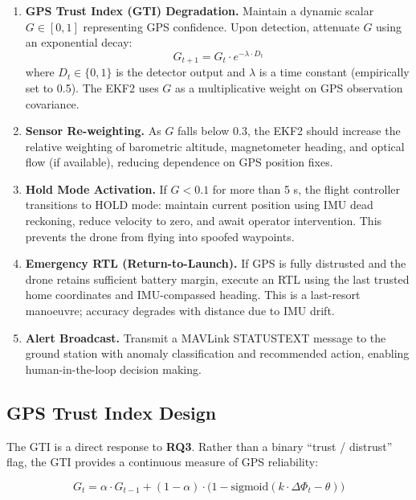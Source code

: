 \documentclass[11pt,a4paper]{article}
\begin{document}
\begin{enumerate}
    \item \textbf{GPS Trust Index (GTI) Degradation.} Maintain a dynamic scalar $G \in [0, 1]$ representing GPS confidence. Upon detection, attenuate $G$ using an exponential decay:
    \begin{equation}
        G_{t+1} = G_t \cdot e^{-\lambda \cdot D_t}
    \end{equation}
    where $D_t \in \{0, 1\}$ is the detector output and $\lambda$ is a time constant (empirically set to 0.5). The EKF2 uses $G$ as a multiplicative weight on GPS observation covariance.

    \item \textbf{Sensor Re-weighting.} As $G$ falls below 0.3, the EKF2 should increase the relative weighting of barometric altitude, magnetometer heading, and optical flow (if available), reducing dependence on GPS position fixes.

    \item \textbf{Hold Mode Activation.} If $G < 0.1$ for more than 5 s, the flight controller transitions to HOLD mode: maintain current position using IMU dead reckoning, reduce velocity to zero, and await operator intervention. This prevents the drone from flying into spoofed waypoints.

    \item \textbf{Emergency RTL (Return-to-Launch).} If GPS is fully distrusted and the drone retains sufficient battery margin, execute an RTL using the last trusted home coordinates and IMU-compassed heading. This is a last-resort manoeuvre; accuracy degrades with distance due to IMU drift.

    \item \textbf{Alert Broadcast.} Transmit a MAVLink STATUSTEXT message to the ground station with anomaly classification and recommended action, enabling human-in-the-loop decision making.
\end{enumerate}

\subsection{GPS Trust Index Design}

The GTI is a direct response to \textbf{RQ3}. Rather than a binary ``trust / distrust'' flag, the GTI provides a continuous measure of GPS reliability:

\begin{equation}
    G_t = \alpha \cdot G_{t-1} + (1 - \alpha) \cdot \bigl( 1 - \text{sigmoid}(k \cdot \Delta \Phi_t - \theta) \bigr)
\end{equation}
\end{document}
